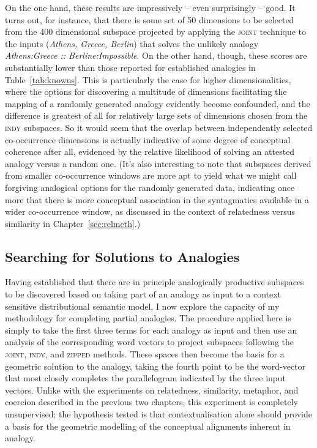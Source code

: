 On the one hand, these results are impressively -- even surprisingly -- good.  It turns out, for instance, that there is some set of 50 dimensions to be selected from the 400 dimensional subspace projected by applying the \textsc{joint} technique to the inputs (\emph{Athens, Greece, Berlin}) that solves the unlikely analogy \emph{Athens:Greece :: Berline:Impossible}.  On the other hand, though, these scores are substantially lower than those reported for established analogies in Table~\ref{tab:knowns}.  This is particularly the case for higher dimensionalities, where the options for discovering a multitude of dimensions facilitating the mapping of a randomly generated analogy evidently become confounded, and the difference is greatest of all for relatively large sets of dimensions chosen from the \textsc{indy} subspaces.  So it would seem that the overlap between independently selected co-occurrence dimensions is actually indicative of some degree of conceptual coherence after all, evidenced by the relative likelihood of solving an attested analogy versus a random one.  (It's also interesting to note that subspaces derived from smaller co-occurrence windows are more apt to yield what we might call forgiving analogical options for the randomly generated data, indicating once more that there is more conceptual association in the syntagmatics available in a wider co-occurrence window, as discussed in the context of relatedness versus similarity in Chapter~\ref{sec:relmeth}.)

\subsection{Searching for Solutions to Analogies}
Having established that there are in principle analogically productive subspaces to be discovered based on taking part of an analogy as input to a context sensitive distributional semantic model, I now explore the capacity of my methodology for completing partial analogies.  The procedure applied here is simply to take the first three terms for each analogy as input and then use an analysis of the corresponding word vectors to project subspaces following the \textsc{joint}, \textsc{indy}, and \textsc{zipped} methods.  These spaces then become the basis for a geometric solution to the analogy, taking the fourth point to be the word-vector that most closely completes the parallelogram indicated by the three input vectors.  Unlike with the experiments on relatedness, similarity, metaphor, and coercion described in the previous two chapters, this experiment is completely unsupervised; the hypothesis tested is that contextualisation alone should provide a basis for the geometric modelling of the conceptual alignments inherent in analogy.

